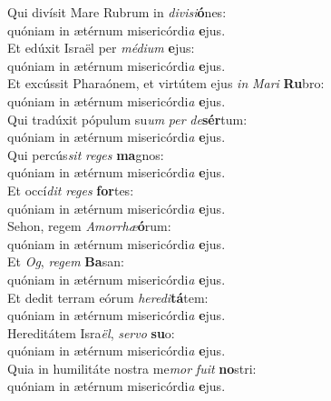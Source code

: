 \oddverse Qui divísit Mare Rubrum in \textit{di}\textit{vi}\textit{si}\textbf{ó}nes:~\*\\
\oddverse quóniam in ætérnum misericórdi\textit{a} \textbf{e}jus.\\
\evenverse Et edúxit Israël per \textit{mé}\textit{di}\textit{um} \textbf{e}jus:~\*\\
\evenverse quóniam in ætérnum misericórdi\textit{a} \textbf{e}jus.\\
\oddverse Et excússit Pharaónem, et virtútem ejus \textit{in} \textit{Ma}\textit{ri} \textbf{Ru}bro:~\*\\
\oddverse quóniam in ætérnum misericórdi\textit{a} \textbf{e}jus.\\
\evenverse Qui tradúxit pópulum su\textit{um} \textit{per} \textit{de}\textbf{sér}tum:~\*\\
\evenverse quóniam in ætérnum misericórdi\textit{a} \textbf{e}jus.\\
\oddverse Qui percús\textit{sit} \textit{re}\textit{ges} \textbf{ma}gnos:~\*\\
\oddverse quóniam in ætérnum misericórdi\textit{a} \textbf{e}jus.\\
\evenverse Et occí\textit{dit} \textit{re}\textit{ges} \textbf{for}tes:~\*\\
\evenverse quóniam in ætérnum misericórdi\textit{a} \textbf{e}jus.\\
\oddverse Sehon, regem \textit{A}\textit{mor}\textit{rhæ}\textbf{ó}rum:~\*\\
\oddverse quóniam in ætérnum misericórdi\textit{a} \textbf{e}jus.\\
\evenverse Et \textit{Og}, \textit{re}\textit{gem} \textbf{Ba}san:~\*\\
\evenverse quóniam in ætérnum misericórdi\textit{a} \textbf{e}jus.\\
\oddverse Et dedit terram eórum \textit{he}\textit{re}\textit{di}\textbf{tá}tem:~\*\\
\oddverse quóniam in ætérnum misericórdi\textit{a} \textbf{e}jus.\\
\evenverse Hereditátem Isra\textit{ël}, \textit{ser}\textit{vo} \textbf{su}o:~\*\\
\evenverse quóniam in ætérnum misericórdi\textit{a} \textbf{e}jus.\\
\oddverse Quia in humilitáte nostra me\textit{mor} \textit{fu}\textit{it} \textbf{no}stri:~\*\\
\oddverse quóniam in ætérnum misericórdi\textit{a} \textbf{e}jus.\\
